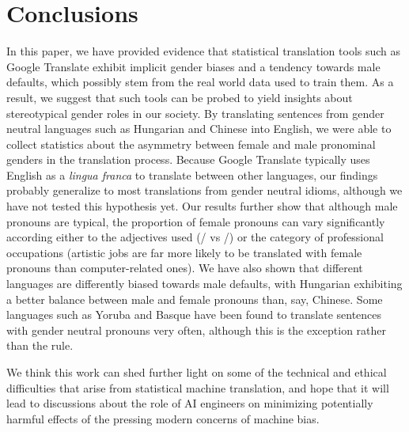 \documentclass[jair,twoside,11pt,theapa]{article}
\begin{document}
\section{Conclusions}
In this paper, we have provided evidence that statistical translation tools such as Google Translate exhibit implicit gender biases and a tendency towards male defaults, which possibly stem from the real world data used to train them. As a result, we suggest that such tools can be probed to yield insights about stereotypical gender roles in our society. By translating sentences from gender neutral languages such as Hungarian and Chinese into English, we were able to collect statistics about the asymmetry between female and male pronominal genders in the translation process. Because Google Translate typically uses English as a \emph{lingua franca} to translate between other languages, our findings probably generalize to most translations from gender neutral idioms, although we have not tested this hypothesis yet. Our results further show that although male pronouns are typical, the proportion of female pronouns can vary significantly according either to the adjectives used (/ vs /) or the category of professional occupations (artistic jobs are far more likely to be translated with female pronouns than computer-related ones). We have also shown that different languages are differently biased towards male defaults, with Hungarian exhibiting a better balance between male and female pronouns than, say, Chinese. Some languages such as Yoruba and Basque have been found to translate sentences with gender neutral pronouns very often, although this is the exception rather than the rule.

We think this work can shed further light on some of the technical and ethical difficulties that arise from statistical machine translation, and hope that it will lead to discussions about the role of AI engineers on minimizing potentially harmful effects of the pressing modern concerns of machine bias.

\vskip 0.2in



\end{document}
